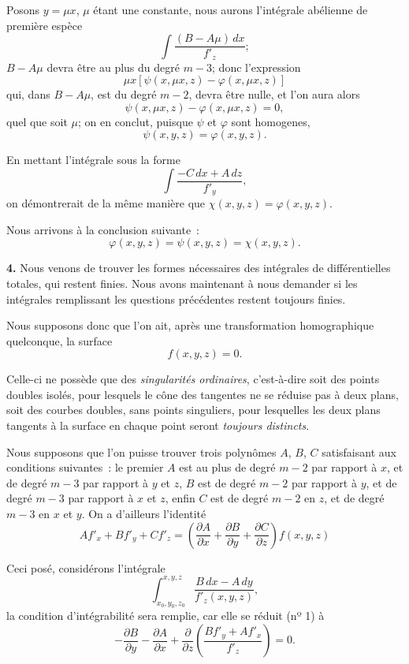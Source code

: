 \documentclass{article}
\begin{document}
Posons $y = \mu x$, $\mu$ étant une constante, nous aurons l'intégrale abélienne de première espèce
\[
\int \frac{(B - A\mu)\,dx}{f'_{z}};
\]
$B - A\mu$ devra être au plus du degré $m - 3$; donc l'expression
\[
\mu x[\psi(x, \mu x, z) - \varphi(x, \mu x, z)]
\]
qui, dans $B - A\mu$, est du degré $m - 2$, devra être nulle, et l'on aura alors
\[
\psi(x, \mu x, z) - \varphi(x, \mu x, z) = 0,
\]
quel que soit $\mu$; on en conclut, puisque $\psi$ et $\varphi$ sont homogenes,
\[
\psi(x, y, z) = \varphi(x, y, z).
\]

En mettant l'intégrale sous la forme
\[
\int \frac{-C\,dx + A\,dz}{f'_{y}},
\]
on démontrerait de la même manière que $\chi(x, y, z) = \varphi(x, y, z)$.

Nous arrivons à la conclusion suivante~:
\[
\varphi(x, y, z) = \psi(x, y, z) = \chi(x, y, z).
\]

\textbf{4.} Nous venons de trouver les formes nécessaires des intégrales de différentielles totales, qui restent finies. Nous avons maintenant à nous demander si les intégrales remplissant les questions précédentes restent toujours finies.


Nous supposons donc que l'on ait, après une transformation homographique quelconque, la surface
\[
f(x, y, z) = 0.
\]

Celle-ci ne possède que des \emph{singularités ordinaires}, c'est-à-dire soit des points doubles isolés, pour lesquels le cône des tangentes ne se réduise pas à deux plans, soit des courbes doubles, sans points singuliers, pour lesquelles les deux plans tangents à la surface en chaque point seront \emph{toujours distincts}.

Nous supposons que l'on puisse trouver trois polynômes $A$, $B$, $C$ satisfaisant aux conditions suivantes~: le premier $A$ est au plus de degré $m - 2$ par rapport à $x$, et de degré $m - 3$ par rapport à $y$ et $z$, $B$ est de degré $m - 2$ par rapport à $y$, et de degré $m - 3$ par rapport à $x$ et $z$, enfin $C$ est de degré $m - 2$ en $z$, et de degré $m - 3$ en $x$ et $y$. On a d'ailleurs l'identité
\[
A f'_{x} + B f'_{y} + C f'_{z} = \left( \frac{\partial A}{\partial x} + \frac{\partial B}{\partial y} + \frac{\partial C}{\partial z} \right) f(x, y, z)
\tag{2}
\]

Ceci posé, considérons l'intégrale
\[
\int_{x_{0}, y_{0}, z_{0}}^{x, y, z} \frac{B\,dx - A\,dy}{f'_{z}(x, y, z)},
\]
la condition d'intégrabilité sera remplie, car elle se réduit (nº 1) à
\[
- \frac{\partial B}{\partial y} - \frac{\partial A}{\partial x} + \frac{\partial}{\partial z} \left( \frac{B f'_{y} + A f'_{x}}{f'_{z}} \right) = 0.
\]
\end{document}
